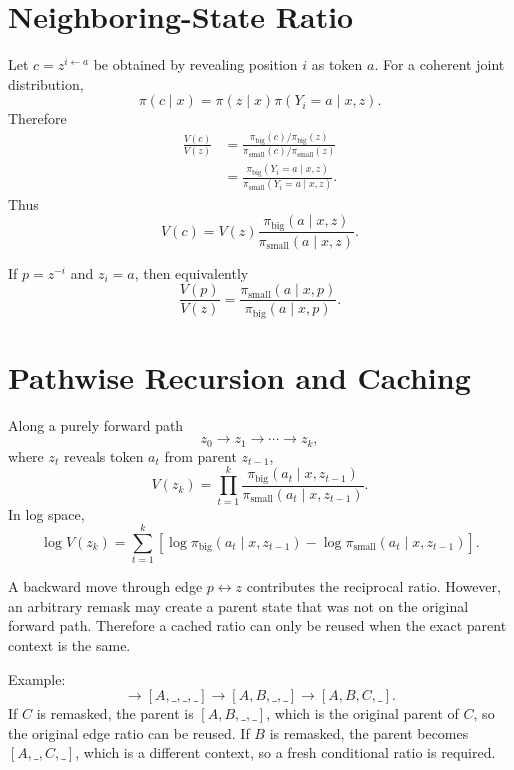 \documentclass[11pt]{article}
\newcommand{\pb}{\pi_{\mathrm{big}}}
\newcommand{\ps}{\pi_{\mathrm{small}}}
\begin{document}
\section{Neighboring-State Ratio}

Let $c=z^{i\leftarrow a}$ be obtained by revealing position $i$ as token $a$.
For a coherent joint distribution,
\begin{equation}
\pi(c\mid x)
=
\pi(z\mid x)\pi(Y_i=a\mid x,z).
\end{equation}
Therefore
\begin{align}
\frac{V(c)}{V(z)}
&=
\frac{\pb(c)/\pb(z)}{\ps(c)/\ps(z)}\\
&=
\frac{\pb(Y_i=a\mid x,z)}{\ps(Y_i=a\mid x,z)}.
\end{align}
Thus
\begin{equation}
\boxed{
V(c)
=
V(z)
\frac{\pb(a\mid x,z)}{\ps(a\mid x,z)}.
}
\end{equation}

If $p=z^{-i}$ and $z_i=a$, then equivalently
\begin{equation}
\boxed{
\frac{V(p)}{V(z)}
=
\frac{\ps(a\mid x,p)}{\pb(a\mid x,p)}.
}
\end{equation}

\section{Pathwise Recursion and Caching}

Along a purely forward path
\begin{equation}
z_0\to z_1\to\cdots\to z_k,
\end{equation}
where $z_t$ reveals token $a_t$ from parent $z_{t-1}$,
\begin{equation}
V(z_k)
=
\prod_{t=1}^{k}
\frac{\pb(a_t\mid x,z_{t-1})}{\ps(a_t\mid x,z_{t-1})}.
\end{equation}
In log space,
\begin{equation}
\log V(z_k)
=
\sum_{t=1}^{k}
\left[
\log\pb(a_t\mid x,z_{t-1})
-
\log\ps(a_t\mid x,z_{t-1})
\right].
\end{equation}

A backward move through edge $p\leftrightarrow z$ contributes the reciprocal ratio.
However, an arbitrary remask may create a parent state that was not on the original forward path. Therefore a cached ratio can only be reused when the exact parent context is the same.

Example:
\begin{equation}
[\_,\_,\_,\_]
\to
[A,\_,\_,\_]
\to
[A,B,\_,\_]
\to
[A,B,C,\_].
\end{equation}
If $C$ is remasked, the parent is $[A,B,\_,\_]$, which is the original parent of $C$, so the original edge ratio can be reused.
If $B$ is remasked, the parent becomes $[A,\_,C,\_]$, which is a different context, so a fresh conditional ratio is required.
\end{document}
